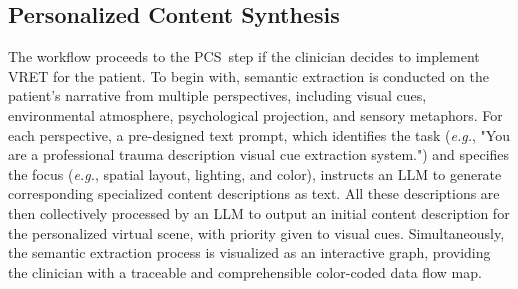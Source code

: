 \documentclass[]{interact}
\newcommand{\eg}{\emph{e.g.}}
\newcommand{\stepb}{Personalized Content Synthesis}
\newcommand{\stepbs}{PCS}
\begin{document}
\subsection{\stepb}
The workflow proceeds to the \stepbs~step if the clinician decides to implement VRET for the patient. To begin with, semantic extraction is conducted on the patient's narrative from multiple perspectives, including visual cues, environmental atmosphere, psychological projection, and sensory metaphors.
For each perspective, a pre-designed text prompt, which identifies the task (\eg, "You are a professional trauma description visual cue extraction system.") and specifies the focus (\eg, spatial layout, lighting, and color), instructs an LLM to generate corresponding specialized content descriptions as text.
All these descriptions are then collectively processed by an LLM to output an initial content description for the personalized virtual scene, with priority given to visual cues. Simultaneously, the semantic extraction process is visualized as an interactive graph, providing the clinician with a traceable and comprehensible color-coded data flow map.



\end{document}
